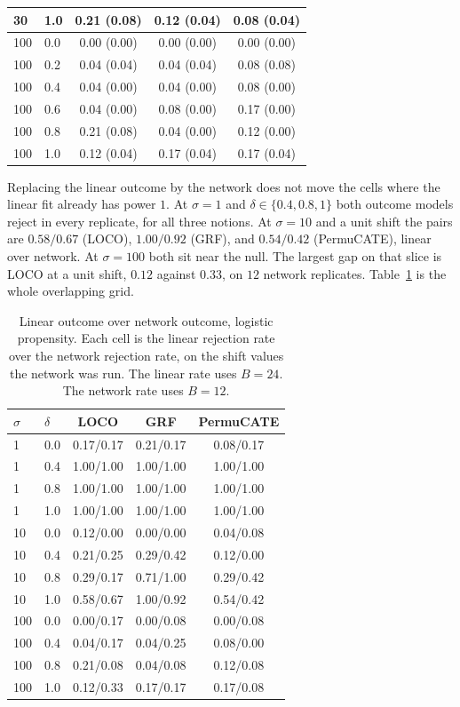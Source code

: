 \begin{table}[p]
\begin{tabular}{llccc}
30 & 1.0 & 0.21 (0.08) & 0.12 (0.04) & 0.08 (0.04) \\
\midrule
100 & 0.0 & 0.00 (0.00) & 0.00 (0.00) & 0.00 (0.00) \\
100 & 0.2 & 0.04 (0.04) & 0.04 (0.04) & 0.08 (0.08) \\
100 & 0.4 & 0.04 (0.00) & 0.04 (0.00) & 0.08 (0.00) \\
100 & 0.6 & 0.04 (0.00) & 0.08 (0.00) & 0.17 (0.00) \\
100 & 0.8 & 0.21 (0.08) & 0.04 (0.00) & 0.12 (0.00) \\
100 & 1.0 & 0.12 (0.04) & 0.17 (0.04) & 0.17 (0.04) \\
\bottomrule
\end{tabular}
\end{table}

Replacing the linear outcome by the network does not move the cells where
the linear fit already has power \(1\).
At \(\sigma=1\) and \(\delta\in\{0.4,0.8,1\}\) both outcome models reject in
every replicate, for all three notions.
At \(\sigma=10\) and a unit shift the pairs are \(0.58/0.67\) (LOCO),
\(1.00/0.92\) (GRF), and \(0.54/0.42\) (PermuCATE), linear over network.
At \(\sigma=100\) both sit near the null.
The largest gap on that slice is LOCO at a unit shift, \(0.12\) against
\(0.33\), on \(12\) network replicates.
Table~\ref{tab:lm-mlp} is the whole overlapping grid.

\begin{table}[t]
\centering
\small
\caption{Linear outcome over network outcome, logistic propensity.
Each cell is the linear rejection rate over the network rejection rate,
on the shift values the network was run.
The linear rate uses \(B=24\).
The network rate uses \(B=12\).}
\label{tab:lm-mlp}
\begin{tabular}{llccc}
\toprule
\(\sigma\) & \(\delta\) & LOCO & GRF & PermuCATE \\
\midrule
1 & 0.0 & 0.17/0.17 & 0.21/0.17 & 0.08/0.17 \\
1 & 0.4 & 1.00/1.00 & 1.00/1.00 & 1.00/1.00 \\
1 & 0.8 & 1.00/1.00 & 1.00/1.00 & 1.00/1.00 \\
1 & 1.0 & 1.00/1.00 & 1.00/1.00 & 1.00/1.00 \\
\midrule
10 & 0.0 & 0.12/0.00 & 0.00/0.00 & 0.04/0.08 \\
10 & 0.4 & 0.21/0.25 & 0.29/0.42 & 0.12/0.00 \\
10 & 0.8 & 0.29/0.17 & 0.71/1.00 & 0.29/0.42 \\
10 & 1.0 & 0.58/0.67 & 1.00/0.92 & 0.54/0.42 \\
\midrule
100 & 0.0 & 0.00/0.17 & 0.00/0.08 & 0.00/0.08 \\
100 & 0.4 & 0.04/0.17 & 0.04/0.25 & 0.08/0.00 \\
100 & 0.8 & 0.21/0.08 & 0.04/0.08 & 0.12/0.08 \\
100 & 1.0 & 0.12/0.33 & 0.17/0.17 & 0.17/0.08 \\
\bottomrule
\end{tabular}
\end{table}

